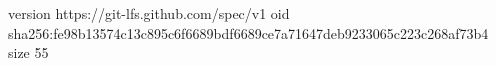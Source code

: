 version https://git-lfs.github.com/spec/v1
oid sha256:fe98b13574c13c895c6f6689bdf6689ce7a71647deb9233065c223c268af73b4
size 55
